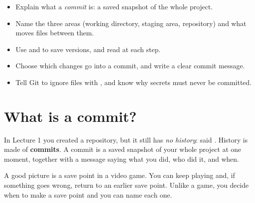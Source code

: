 


\begin{goals}
\begin{itemize}
  \item Explain what a \emph{commit} is: a saved snapshot of the whole project.
  \item Name the three areas (working directory, staging area, repository) and what moves files between them.
  \item Use  and  to save versions, and read  at each step.
  \item Choose which changes go into a commit, and write a clear commit message.
  \item Tell Git to ignore files with , and know why secrets must never be committed.
\end{itemize}
\end{goals}

\section{What is a commit?}

In Lecture 1 you created a repository, but it still has \emph{no history}:  said . History is made of \textbf{commits}. A commit is a saved snapshot of your whole project at one moment, together with a message saying what you did, who did it, and when.

A good picture is a save point in a video game. You can keep playing and, if something goes wrong, return to an earlier save point. Unlike a game, you decide when to make a save point and you can name each one.

